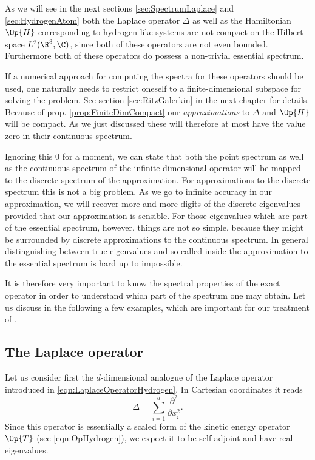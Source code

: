 \begin{rem}
	\label{rem:NumericalEssentialSpectrum}
As we will see in the next sections \vref{sec:SpectrumLaplace}
and \vref{sec:HydrogenAtom} both the Laplace operator $\Delta$ as well as the
Hamiltonian $\Op{H}$ corresponding to hydrogen-like systems
are not compact on the Hilbert space $L^2(\R^3, \C)$,
since both of these operators are not even bounded.
Furthermore both of these operators do possess a non-trivial essential spectrum.

If a numerical approach for computing the spectra for these operators
should be used,
one naturally needs to restrict oneself to a finite-dimensional subspace
for solving the problem.
See section \vref{sec:RitzGalerkin} in the next chapter for details.
Because of prop. \vref{prop:FiniteDimCompact} our \emph{approximations}
to $\Delta$ and $\Op{H}$ will be compact.
As we just discussed these will therefore
at most have the value zero in their continuous spectrum.

Ignoring this $0$ for a moment,
we can state that
both the point spectrum as well as the continuous spectrum
of the infinite-dimensional operator will be mapped to the discrete
spectrum of the approximation.
For approximations to the discrete spectrum this is not a big problem.
As we go to infinite accuracy in our approximation,
we will recover more and more digits of the discrete eigenvalues
provided that our approximation is sensible.
For those eigenvalues which are part of the essential spectrum, however,
things are not so simple, because they might be surrounded by
discrete approximations to the continuous spectrum.
In general distinguishing between true eigenvalues
and so-called  inside the approximation
to the essential spectrum is hard up to impossible.
\end{rem}

It is therefore very important to know
the spectral properties of the exact operator
in order to understand which part of the spectrum one may obtain.
Let us discuss in the following a few examples,
which are important for our treatment of \QM.

\subsection{The Laplace operator}
\label{sec:SpectrumLaplace}
Let us consider first the $d$-dimensional analogue of the Laplace operator
introduced in \eqref{eqn:LaplaceOperatorHydrogen}.
In Cartesian coordinates it reads
\begin{equation}
	\Delta = \sum_{i=1}^d \frac{\partial^2}{\partial x_i^2}.
	\label{eqn:LaplaceOperatorD}
\end{equation}
Since this operator is essentially a scaled form of the kinetic energy operator $\Op{T}$
(see \eqref{eqn:OpHydrogen}),
we expect it to be self-adjoint and have real eigenvalues.

